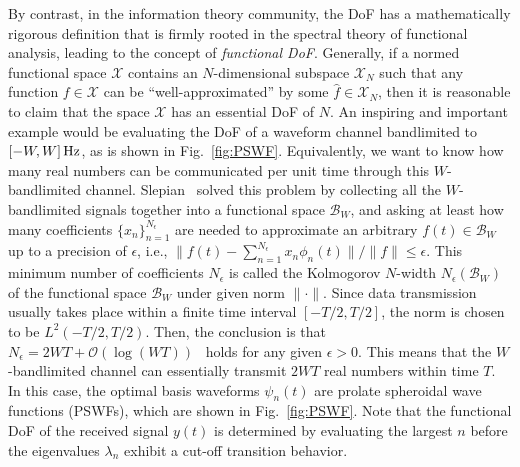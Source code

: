 \documentclass[journal,twocolumn]{IEEEtran}
\begin{document}
By contrast, in the information theory community, the DoF has a mathematically rigorous definition that is firmly rooted in the spectral theory of functional analysis, leading to the concept of {\emph{functional DoF}}. 
Generally, if a normed functional space $\mathcal{X}$ contains an $N$-dimensional subspace $\mathcal{X}_N$ such that any function $f\in\mathcal{X}$ can be ``well-approximated'' by some $\hat{f}\in\mathcal{X}_N$, then it is reasonable to claim that the space $\mathcal{X}$ has an essential DoF of $N$.  
An inspiring and important example would be evaluating the DoF of a waveform channel bandlimited to $[-W, W]\, {\rm Hz}$, as is shown in Fig.~\ref{fig:PSWF}. Equivalently, we want to know how many real numbers can be communicated per unit time through this $W$-bandlimited channel. 
Slepian~\cite{slepian1961prolate} solved this problem by collecting all the $W$-bandlimited signals together into a functional space $\mathcal{B}_W$, and asking at least how many coefficients $\{x_n\}_{n=1}^{N_\epsilon}$ are needed to approximate an arbitrary $f(t)\in \mathcal{B}_W$ up to a precision of $\epsilon$, i.e., $\|f(t)-\sum_{n=1}^{N_\epsilon}x_n\phi_n(t)\|/\|f\|\leq \epsilon$.
This minimum number of coefficients $N_\epsilon$ is called the Kolmogorov $N$-width $N_\epsilon(\mathcal{B}_W)$ of the functional space $\mathcal{B}_W$ under given norm $\|\cdot\|$. Since data transmission usually takes place within a finite time interval $[-T/2, T/2]$, the norm is chosen to be $L^2(-T/2, T/2)$. Then, the conclusion is that $N_\epsilon=2WT+\mathcal{O}(\log (WT))$~\cite{slepian1961prolate} holds for any given $\epsilon>0$. 
This means that the $W$-bandlimited channel can essentially transmit $2WT$ real numbers within time $T$. 
In this case, the optimal basis waveforms $\psi_n(t)$ are prolate spheroidal wave functions (PSWFs), which are shown in Fig.~\ref{fig:PSWF}. Note that the functional DoF of the received signal $y(t)$ is determined by evaluating the largest $n$ before the eigenvalues $\lambda_n$ exhibit a cut-off transition behavior. 
\end{document}

